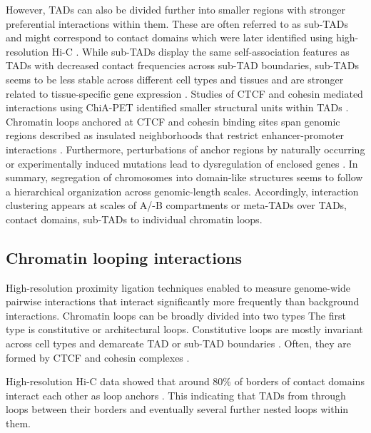 \documentclass[a4paper,twoside=true,openright,parskip=full,chapterprefix=true,11pt,headings=normal,bibliography=totoc,listof=totoc,titlepage=on,captions=tableabove,draft=false]{scrreprt}
\theoremstyle{definition}
\theoremstyle{definition}
\theoremstyle{definition}
\theoremstyle{remark}
\begin{document}
However, TADs can also be divided further into smaller regions with
stronger preferential interactions within them. These are often referred
to as sub-TADs \citep{Phillips-Cremins2013} and might correspond to
contact domains which were later identified using high-resolution Hi-C
\citep{Rao2014}. While sub-TADs display the same self-association
features as TADs with decreased contact frequencies across sub-TAD
boundaries, sub-TADs seems to be less stable across different cell types
and tissues and are stronger related to tissue-specific gene expression
\citep{Berlivet2013, Phillips-Cremins2013}. Studies of CTCF and cohesin
mediated interactions using ChiA-PET identified smaller structural units
within TADs \citep{Dowen2014}. Chromatin loops anchored at CTCF and
cohesin binding sites span genomic regions described as insulated
neighborhoods that restrict enhancer-promoter interactions
\citep{Hnisz2016a}. Furthermore, perturbations of anchor regions by
naturally occurring or experimentally induced mutations lead to
dysregulation of enclosed genes \citep{Dowen2014, Hnisz2016, Ji2016}. In
summary, segregation of chromosomes into domain-like structures seems to
follow a hierarchical organization across genomic-length scales.
Accordingly, interaction clustering appears at scales of A/-B
compartments or meta-TADs over TADs, contact domains, sub-TADs to
individual chromatin loops.

\hypertarget{chromatin-looping-interactions}{%
\subsection{Chromatin looping
interactions}\label{chromatin-looping-interactions}}

High-resolution proximity ligation techniques enabled to measure
genome-wide pairwise interactions that interact significantly more
frequently than background interactions. Chromatin loops can be broadly
divided into two types \citep{Yu2017, Andrey2017} The first type is
constitutive or architectural loops. Constitutive loops are mostly
invariant across cell types and demarcate TAD or sub-TAD boundaries
\citep{Dowen2014, Ji2016, Phillips-Cremins2013}. Often, they are formed
by CTCF and cohesin complexes \citep{Rao2014}.

High-resolution Hi-C data showed that around 80\% of borders of contact
domains interact each other as loop anchors \citep{Rao2014}. This
indicating that TADs from through loops between their borders and
eventually several further nested loops within them.
\end{document}
